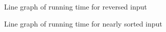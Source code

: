 \documentclass[12pt,a4paper]{article}
\begin{document}
\begin{center}
\begin{figure}[H]
\caption{Line graph of running time for reversed input}
\end{figure}
\end{center}

\begin{center}
\begin{figure}[H]
\caption{Line graph of running time for nearly sorted input}
\end{figure}
\end{center}
\end{document}
